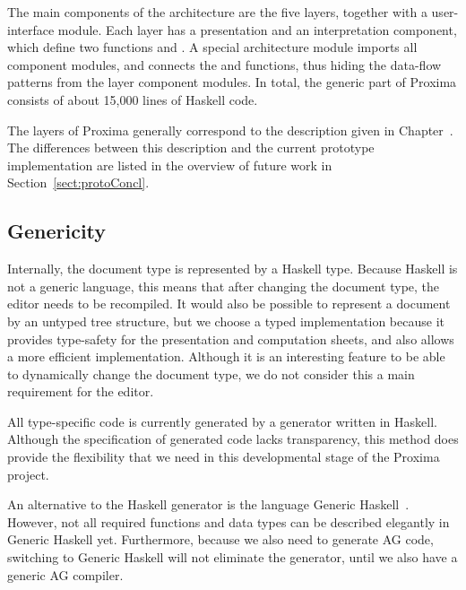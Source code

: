 
The main components of the architecture are the five layers, together with a user-interface module. 
Each layer has a presentation and an interpretation component, which define two functions  and . A special architecture module imports all component modules, and connects the   and  functions, thus hiding the data-flow patterns from the layer component modules. In total, the generic part of Proxima consists of about 15,000 lines of Haskell code. 


%
%

\bc
The layers of Proxima generally correspond to the description given in Chapter~. The differences between this description and the current prototype implementation are listed in the overview of future work in  Section~\ref{sect:protoConcl}. %
\ec

\subsection{Genericity}

Internally, the document type is represented by a Haskell type. Because Haskell is not a generic language, this means that after changing the document type, the editor needs to be recompiled. It would also be possible to represent a document by an untyped tree structure, but we choose a typed implementation because it provides type-safety for the presentation and computation sheets, and also allows a more efficient implementation. Although it is an interesting feature to be able to dynamically change the document type, we do not consider this a main requirement for the editor.

All type-specific code is currently generated by a generator written in Haskell. Although the specification of generated code lacks transparency, this method does provide the flexibility that we need in this developmental stage of the Proxima project. 

An alternative to the Haskell generator is the language Generic Haskell~\cite{loeh04exploringGH}. However, not all required functions and data types can be described elegantly in Generic Haskell yet. Furthermore, because we also need to generate AG code, switching to Generic Haskell will not eliminate the generator, until we also have a generic AG compiler.



